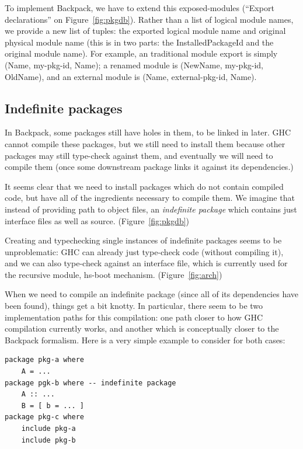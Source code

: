 \documentclass{article}
\begin{document}
To implement Backpack, we have to extend this exposed-modules (``Export declarations''
on Figure~\ref{fig:pkgdb}).  Rather
than a list of logical module names, we provide a new list of tuples:
the exported logical module name and original physical module name (this
is in two parts: the InstalledPackageId and the original module name).
For example, an traditional module export is simply (Name, my-pkg-id, Name);
a renamed module is (NewName, my-pkg-id, OldName), and an external module
is (Name, external-pkg-id, Name).

\subsection{Indefinite packages}

In Backpack, some packages still have holes in them, to be linked in later.
GHC cannot compile these packages, but we still need to install them because
other packages may still type-check against them, and eventually we will
need to compile them (once some downstream package links it against its
dependencies.)

It seems clear that we need to install packages which do not contain
compiled code, but have all of the ingredients necessary to compile them.
We imagine that instead of providing path to object files, an \emph{indefinite
package} which contains just interface files as well as source. (Figure~\ref{fig:pkgdb})

Creating and typechecking single instances of indefinite packages seems to
be unproblematic: GHC can already just type-check code (without compiling it),
and we can also type-check against an interface file, which is currently used for
the recursive module, hs-boot mechanism. (Figure~\ref{fig:arch})

When we need to compile an indefinite package (since all of its
dependencies have been found), things get a bit knotty.  In particular,
there seem to be two implementation paths for this compilation: one path
closer to how GHC compilation currently works, and another which is
conceptually closer to the Backpack formalism.  Here is a very simple
example to consider for both cases:

\begin{verbatim}
package pkg-a where
    A = ...
package pgk-b where -- indefinite package
    A :: ...
    B = [ b = ... ]
package pkg-c where
    include pkg-a
    include pkg-b
\end{verbatim}
\end{document}

